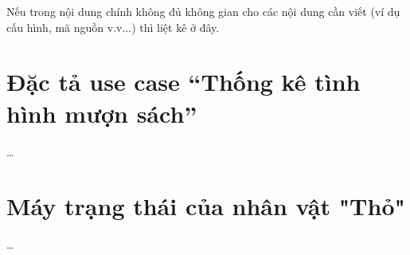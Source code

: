 \documentclass[../DoAn.tex]{subfiles}
\begin{document}
Nếu trong nội dung chính không đủ không gian cho các nội dung cần viết (ví dụ cấu hình, mã nguồn v.v...) thì liệt kê ở đây.

\section{Đặc tả use case ``Thống kê tình hình mượn sách''}
\ldots

\section{Máy trạng thái của nhân vật "Thỏ"}
\ldots
\end{document}
